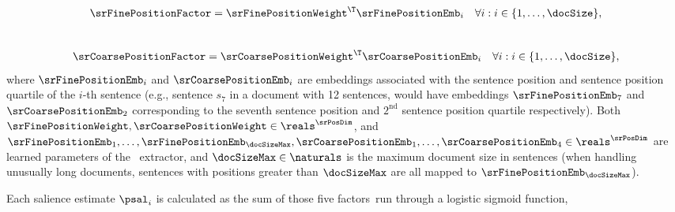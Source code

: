 \noindent{}\\[-40pt]
\begin{align}
    \srFinePositionFactor& = {\srFinePositionWeight}^\T \srFinePositionEmb_i
& \forall i : i \in \{1,\ldots,\docSize\}, 
\end{align}
\noindent{}\\[-40pt]
\begin{align}
    \srCoarsePositionFactor& = {\srCoarsePositionWeight}^\T \srCoarsePositionEmb_i & \forall i : i \in \{1,\ldots,\docSize\}, 
\end{align}
where $\srFinePositionEmb_i$ and $\srCoarsePositionEmb_i$ are embeddings
associated with the sentence position and sentence position quartile of the
$i$-th sentence (e.g., sentence $s_7$ in a document with 12 sentences, would
have embeddings $\srFinePositionEmb_7$ and $\srCoarsePositionEmb_2$
corresponding to the seventh sentence position and $2^\textrm{nd}$ sentence
position quartile respectively).  Both $\srFinePositionWeight,
\srCoarsePositionWeight \in \reals^{\srPosDim}$, and
$\srFinePositionEmb_1,\ldots,\srFinePositionEmb_\docSizeMax,\srCoarsePositionEmb_1,\ldots,\srCoarsePositionEmb_4
\in \reals^{\srPosDim}$ are learned parameters of the \srext~extractor, and
$\docSizeMax\in\naturals$ is the maximum document size in sentences (when
handling unusually long documents, sentences with positions greater than
$\docSizeMax$ are all mapped to $\srFinePositionEmb_\docSizeMax$).

Each salience estimate $\psal_i$ is calculated as the sum of those five
factors~run through a logistic sigmoid function,\\~\\

